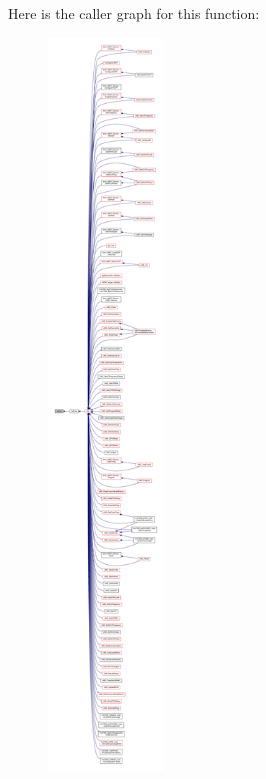 Here is the caller graph for this function\+:
\nopagebreak
\begin{figure}[H]
\begin{center}
\leavevmode
\includegraphics[height=550pt]{db/de5/recipes_8c_a5e6092211a5f7e2d6ae9282379d3c604_icgraph}
\end{center}
\end{figure}


